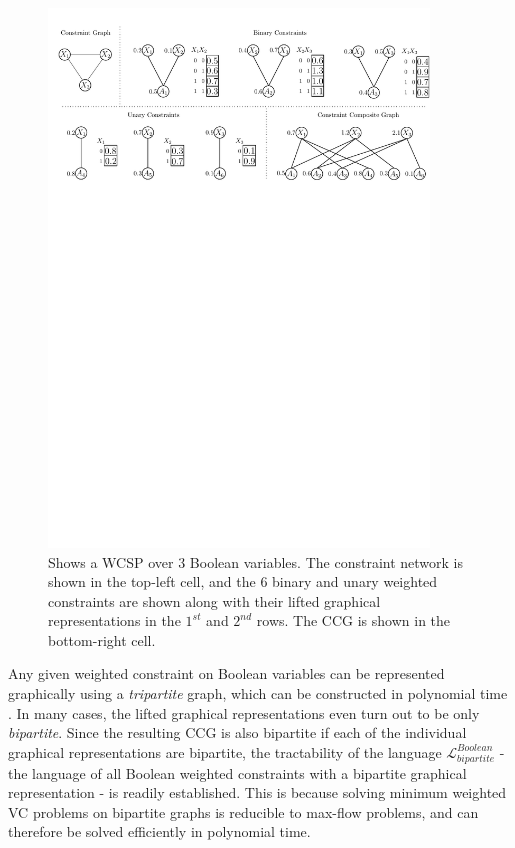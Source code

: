 \begin{figure}[t]
  \centering
  \includegraphics[width=0.9\textwidth]{figs/fig7}
  \caption{Shows a WCSP over $3$ Boolean variables. The constraint network is shown in the top-left cell, and the $6$ binary and unary weighted constraints are shown along with their lifted graphical representations in the $1^{st}$ and $2^{nd}$ rows. The CCG is shown in the bottom-right cell.}
  \label{ccg_example}
\end{figure}

  Any given weighted constraint on Boolean variables can be represented graphically using a \emph{tripartite} graph, which can be constructed in polynomial time \cite{K:CP:08}. In many cases, the lifted graphical representations even turn out to be only \emph{bipartite}. Since the resulting CCG is also bipartite if each of the individual graphical representations are bipartite, the tractability of the language $\mathcal{L}_{bipartite}^{Boolean}$ - the language of all Boolean weighted constraints with a bipartite graphical representation - is readily established. This is because solving minimum weighted VC problems on bipartite graphs is reducible to max-flow problems, and can therefore be solved efficiently in polynomial time.
  
